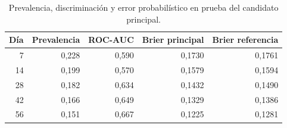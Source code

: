 \begin{table}[!htbp]\centering
\caption{Prevalencia, discriminación y error probabilístico en prueba del candidato principal.}\label{res:calibracion}
\begin{tabular}{rrrrr}
\toprule
Día & Prevalencia & ROC-AUC & Brier principal & Brier referencia\\
\midrule
7 & 0,228 & 0,590 & 0,1730 & 0,1761\\
14 & 0,199 & 0,570 & 0,1579 & 0,1594\\
28 & 0,182 & 0,634 & 0,1432 & 0,1490\\
42 & 0,166 & 0,649 & 0,1329 & 0,1386\\
56 & 0,151 & 0,667 & 0,1225 & 0,1281\\
\bottomrule
\end{tabular}
\end{table}

